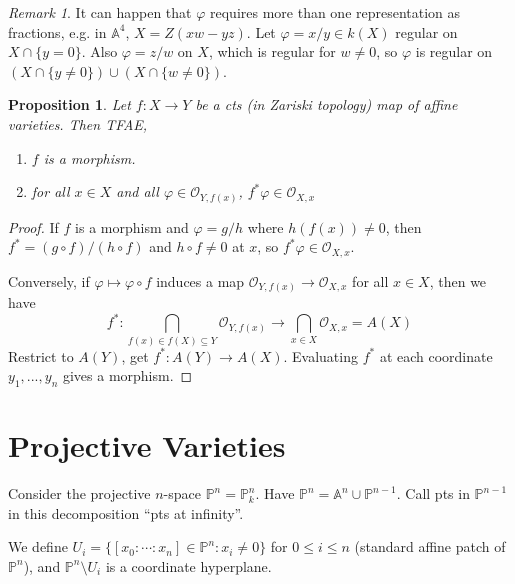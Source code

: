 \documentclass{article}
\theoremstyle{definition}
\theoremstyle{remark}
\newtheorem{rem}{Remark}
\theoremstyle{plain}
\newtheorem{prop}[defn]{Proposition}
\newcommand{\PP}{\mathbb{P}}
\newcommand{\bA}{\mathbb{A}}
\begin{document}
\begin{rem}
    It can happen that $\varphi$ requires more than one representation as fractions, e.g. in $\bA^4$, $X=Z(xw-yz)$. Let $\varphi=x/y\in k(X)$ regular on $X\cap \{y=0\}$. Also $\varphi=z/w$ on $X$, which is regular for $w\neq 0$, so $\varphi$ is regular on $(X\cap\{y\neq 0\})\cup (X\cap \{w\neq 0\})$.
\end{rem}

\begin{prop}
    Let $f:X\to Y$ be a cts (in Zariski topology) map of affine varieties. Then TFAE,
    \begin{enumerate}[1)]
        \item $f$ is a morphism.
        \item for all $x\in X$ and all $\varphi\in\mathcal O_{Y,f(x)}$, $f^\ast\varphi\in\mathcal O_{X,x}$
    \end{enumerate}
\end{prop}
\begin{proof}
    If $f$ is a morphism and $\varphi=g/h$ where $h(f(x))\neq 0$, then $f^\ast=(g\circ f)/(h\circ f)$ and $h\circ f\neq 0$ at $x$, so $f^\ast\varphi\in\mathcal O_{X,x}$. 

    Conversely, if $\varphi\mapsto\varphi\circ f$ induces a map $\mathcal O_{Y,f(x)}\to \mathcal O_{X,x}$ for all $x\in X$, then we have
    \[f^\ast:\bigcap_{f(x)\in f(X)\subseteq Y}\mathcal O_{Y,f(x)}\to\bigcap_{x\in X}\mathcal O_{X,x}=A(X)\]
    Restrict to $A(Y)$, get $f^\ast:A(Y)\to A(X)$. Evaluating $f^\ast$ at each coordinate $y_1,...,y_n$ gives a morphism.
\end{proof}

\section{Projective Varieties}

Consider the projective $n$-space $\PP^n=\PP^n_k$.
Have $\PP^n=\bA^n\cup\PP^{n-1}$. Call pts in $\PP^{n-1}$ in this decomposition ``pts at infinity''.

We define $U_i=\{[x_0:\cdots:x_n]\in\PP^n:x_i\neq 0\}$ for $0\le i\le n$ (standard affine patch of $\PP^n$), and $\PP^n\setminus U_i$ is a coordinate hyperplane. 
\end{document}
